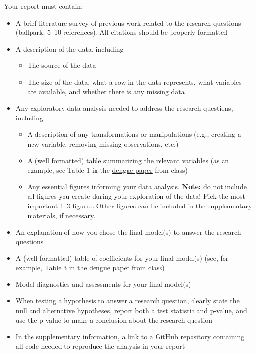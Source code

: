 \documentclass[11pt]{article}
\begin{document}
Your report must contain:
\begin{itemize}
\item A brief literature survey of previous work related to the research questions (ballpark: 5--10 references). All citations should be properly formatted 

\item A description of the data, including
\begin{itemize}
\item The source of the data
\item The size of the data, what a row in the data represents, what variables are available, and whether there is any missing data
\end{itemize}

\item Any exploratory data analysis needed to address the research questions, including
\begin{itemize}
\item A description of any transformations or manipulations (e.g., creating a new variable, removing missing observations, etc.)
\item A (well formatted) table summarizing the relevant variables (as an example, see Table 1 in the \href{https://journals.plos.org/plosntds/article?id=10.1371/journal.pntd.0003638}{\underline{dengue paper}} from class)
\item Any essential figures informing your data analysis. \textbf{Note:} do not include all figures you create during your exploration of the data! Pick the most important 1--3 figures. Other figures can be included in the supplementary materials, if necessary.
\end{itemize}

\item An explanation of how you chose the final model(s) to answer the research questions

\item A (well formatted) table of coefficients for your final model(s) (see, for example, Table 3 in the \href{https://journals.plos.org/plosntds/article?id=10.1371/journal.pntd.0003638}{\underline{dengue paper}} from class)

\item Model diagnostics and assessments for your final model(s)

\item When testing a hypothesis to answer a research question, clearly state the null and alternative hypotheses, report both a test statistic and p-value, and use the p-value to make a conclusion about the research question

\item In the supplementary information, a link to a GitHub repository containing all code needed to reproduce the analysis in your report
\end{itemize}
\end{document}
